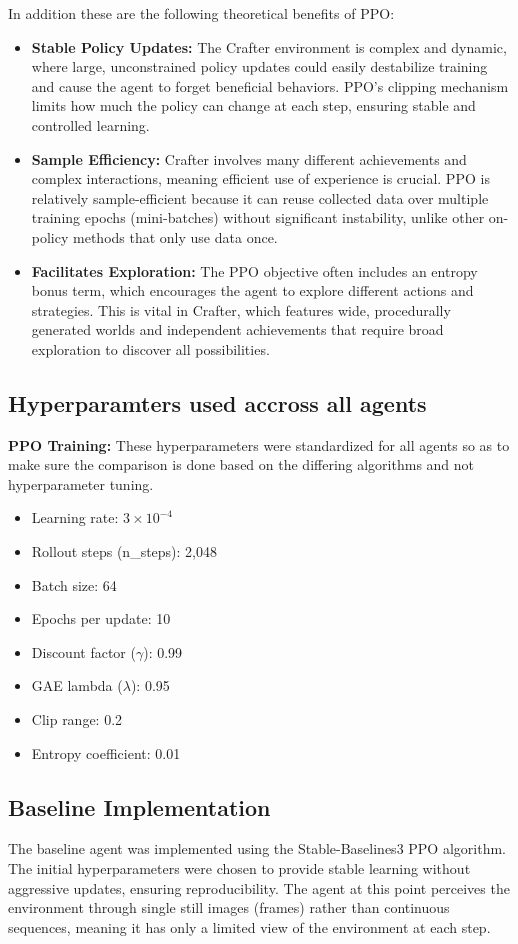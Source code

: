 \documentclass[twocolumn]{article}
\begin{document}
In addition these are the following theoretical benefits of PPO:
\begin{itemize}
    \item \textbf{Stable Policy Updates:} The Crafter environment is complex and dynamic, where large, unconstrained policy updates could easily destabilize training and cause the agent to forget beneficial behaviors. PPO's clipping mechanism limits how much the policy can change at each step, ensuring stable and controlled learning.
    \item \textbf{Sample Efficiency:} Crafter involves many different achievements and complex interactions, meaning efficient use of experience is crucial. PPO is relatively sample-efficient because it can reuse collected data over multiple training epochs (mini-batches) without significant instability, unlike other on-policy methods that only use data once.
    \item \textbf{Facilitates Exploration:} The PPO objective often includes an entropy bonus term, which encourages the agent to explore different actions and strategies. This is vital in Crafter, which features wide, procedurally generated worlds and independent achievements that require broad exploration to discover all possibilities.
\end{itemize}

\subsection*{Hyperparamters used accross all agents}
\textbf{PPO Training:} These hyperparameters were standardized for all agents so as to make sure the comparison is done based on the differing algorithms and not hyperparameter tuning.
\begin{itemize}
    \item Learning rate: $3 \times 10^{-4}$
    \item Rollout steps (n\_steps): 2,048
    \item Batch size: 64
    \item Epochs per update: 10
    \item Discount factor ($\gamma$): 0.99
    \item GAE lambda ($\lambda$): 0.95
    \item Clip range: 0.2
    \item Entropy coefficient: 0.01
\end{itemize}

\subsection*{Baseline Implementation}
The baseline agent was implemented using the Stable-Baselines3 PPO algorithm. The initial hyperparameters were chosen to provide stable learning without aggressive updates, ensuring reproducibility. The agent at this point perceives the environment through single still images (frames) rather than continuous sequences, meaning it has only a limited view of the environment at each step.
\end{document}
